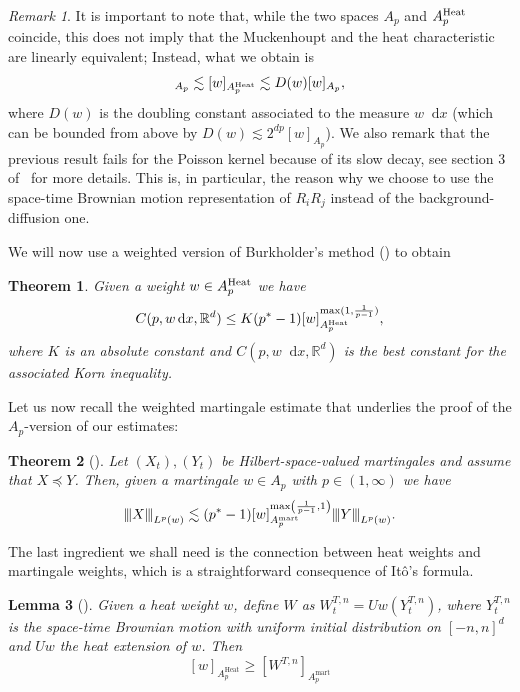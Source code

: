 \documentclass[11pt, a4paper]{amsart}
\newtheorem{theorem}{Theorem}[section]
\newtheorem{lemma}[theorem]{Lemma}
\theoremstyle{definition}
\theoremstyle{remark}
\newtheorem{remark}{Remark}
\newcommand{\R}{\mathbb{R}}
\newcommand*\diff{\mathop{}\!\mathrm{d}}
\newcommand{\vvvert}[1]{
    {\left\vert\kern-0.25ex\left\vert\kern-
    0.25ex\left\vert #1 
    \right\vert\kern-0.25ex\right\vert\kern-
    0.25ex\right\vert}
}
\begin{document}
\begin{remark}
It is important to note that,
while the two spaces $A_p$
and $A^{\text{\upshape{Heat}}}_p$ coincide, this 
does not imply that the Muckenhoupt and the heat
characteristic are linearly equivalent;
Instead, what we obtain is
\begin{equation*}
[w]_{A_p}
\lesssim
[w]_{A^{\text{\upshape Heat}}_p}
\lesssim D(w) [w]_{A_p},
\end{equation*}
where $D(w)$ is the doubling constant
associated to the measure $w\diff x$ (which
can be bounded from above by
$D(w)\lesssim 2^{dp}[w]_{A_p}$).
We also remark that the previous
result fails for the Poisson kernel because 
of its slow decay, see section 3
of~\cite{Fefferman} for more details.
This is, in particular, the reason
why we choose to use the space-time
Brownian motion representation of $R_iR_j$
instead of the background-diffusion one.
\end{remark}
We will now use a weighted version of
Burkholder's method
(\cite[corollary 1]{Petermichl}) to obtain
\begin{theorem}
Given a weight $w\in A_{p}^{\text{\upshape Heat}}$
we have
\begin{equation*}
C(p,w\diff x, \mathbb R^d)
\le K (p^*-1) 
[w]_{A_{p}^{\text{\upshape Heat}}}
^{\max(1,\frac{1}{p-1})},
\end{equation*}
where $K$ is an absolute constant and $C(p,w\diff x, \R^d)$ is the best constant
for the associated Korn inequality.
\end{theorem}
Let us now recall the weighted
martingale estimate that
underlies the proof of the $A_p$-version
of our estimates:
\begin{theorem}[{\cite[Corollary 1]{Petermichl}}]
\label{thm:burkholderweighted}
Let $(X_t),(Y_t)$ be Hilbert-space-valued martingales and
assume that $X \preccurlyeq Y$.
Then, given a martingale $w\in A_p$
with $p\in (1,\infty)$ we have
\begin{equation*}
\vvvert{X}_{L^p(w)}\lesssim (p^*-1)
[w]_{A_p^{\text{\upshape mart}}}^{\max\left(\frac{1}{p-1
},1\right)} \vvvert{Y}_{L^p(w)}.
\end{equation*}
\end{theorem}
The last ingredient we shall need is the connection between
heat weights and martingale weights,
which is a straightforward consequence
of Itô's formula.
\begin{lemma}
[{\cite[Section 4]{banuelos2017weightedsquarefunctionestimates}}]
Given a heat weight
$w$, define $W$ as $W^{T,n}_t=U w(Y_t^{T,n})$,
where $Y_t^{T,n}$ is the space-time Brownian motion with
uniform initial distribution on $[-n,n]^d$ and $Uw$
the heat extension of $w$. Then
\[
[w]_{A_p^{\mathrm{Heat}}}\ge [W^{T,n}]_{A_p^{\mathrm{mart}}}
\]
\end{lemma}
\end{document}
